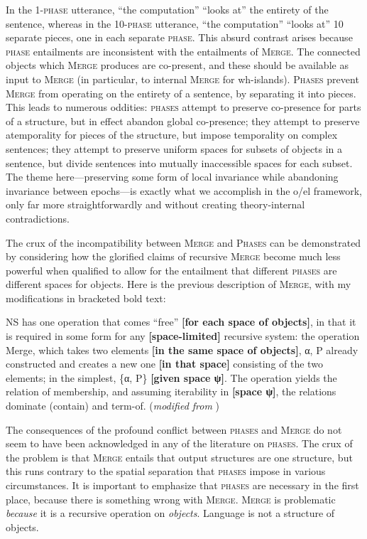   In the 1-\textsc{phase} utterance, “the computation” “looks at” the entirety of the sentence, whereas in the 10-\textsc{phase} utterance, “the computation” “looks at” 10 separate pieces, one in each separate \textsc{phase}. This absurd contrast arises because \textsc{phase} entailments are inconsistent with the entailments of \textsc{Merge}. The connected objects which \textsc{Merge} produces are co-present, and these should be available as input to \textsc{Merge} (in particular, to internal \textsc{Merge} for wh-islands). \textsc{Phases} prevent \textsc{Merge} from operating on the entirety of a sentence, by separating it into pieces. This leads to numerous oddities: \textsc{phases} attempt to preserve co-presence for parts of a structure, but in effect abandon global co-presence; they attempt to preserve atemporality for pieces of the structure, but impose temporality on complex sentences; they attempt to preserve uniform spaces for subsets of objects in a sentence, but divide sentences into mutually inaccessible spaces for each subset. The theme here—preserving some form of local invariance while abandoning invariance between epochs—is exactly what we accomplish in the o/el framework, only far more straightforwardly and without creating theory-internal contradictions. 

  The crux of the incompatibility between \textsc{Merge} and \textsc{Phases} can be demonstrated by considering how the glorified claims of recursive \textsc{Merge} become much less powerful when qualified to allow for the entailment that different \textsc{phases} are different spaces for objects. Here is the previous description of \textsc{Merge}, with my modifications in bracketed bold text:

NS has one operation that comes “free” \textbf{[for each space of objects]}, in that it is required in some form for any \textbf{[space-limited]} recursive system: the operation Merge, which takes two elements \textbf{[in the same space of objects]}, α, P already constructed and creates a new one \textbf{[in that space]} consisting of the two elements; in the simplest, \{α, P\} \textbf{[given space ψ]}. The operation yields the relation of membership, and assuming iterability in \textbf{[space ψ]}, the relations dominate (contain) and term-of. (\textit{modified from} \citealt{Chomsky2001})

  The consequences of the profound conflict between \textsc{phases} and \textsc{Merge} do not seem to have been acknowledged in any of the literature on \textsc{phases}. The crux of the problem is that \textsc{Merge} entails that output structures are one structure, but this runs contrary to the spatial separation that \textsc{phases} impose in various circumstances. It is important to emphasize that \textsc{phases} are necessary in the first place, because there is something wrong with \textsc{Merge}. \textsc{Merge} is problematic \textit{because} it is a recursive operation on \textit{objects}. Language is not a structure of objects.


